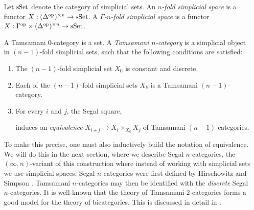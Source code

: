 \documentclass{amsart}
\begin{document}
\begin{definition}
	Let $\mathrm{sSet}$ denote the category of simplicial sets. An {\em $n$-fold simplicial space} is a functor $X: (\Delta^\textrm{op})^{\times n} \to \mathrm{sSet}$. A {\em $\Gamma$-$n$-fold simplicial space} is a functor $X: \Gamma^\textrm{op} \times (\Delta^\textrm{op})^{\times n} \to \mathrm{sSet}$.
\end{definition}

\begin{definition}[Sketch]
	A Tamsamani $0$-category is a set. 	A {\em Tamsamani $n$-category} is a simplicial object in $(n-1)$-fold simplicial sets, such that the following conditions are satisfied: 
	\begin{enumerate}
		\item The $(n-1)$-fold simplicial set $X_0$ is constant and discrete.
		\item Each of the $(n-1)$-fold simplicial sets $X_k$ is a Tamsamani $(n-1)$-category.
		\item For every $i$ and $j$, the Segal square,
		\begin{center}
		\end{center}
		induces an {\em equivalence} $X_{i+j} \to X_i \times_{X_0} X_j$ of Tamsamani $(n-1)$-categories.
	\end{enumerate}
\end{definition} 

\noindent To make this precise, one must also inductively build the notation of equivalence. We will do this in the next section, where we describe Segal $n$-categories, the $(\infty,n)$-variant of this construction where instead of working with simplicial sets we use simplicial spaces; Segal $n$-categories were first defined by Hirschowitz and Simpson \cite{9807049}. Tamsamani $n$-categories may then be identified with the {\em discrete} Segal $n$-categories.  It is well-known that the theory of Tamsamani 2-categories forms a good model for the theory of bicategories. This is discussed in detail in \cite{MR2366560}.
\end{document}
